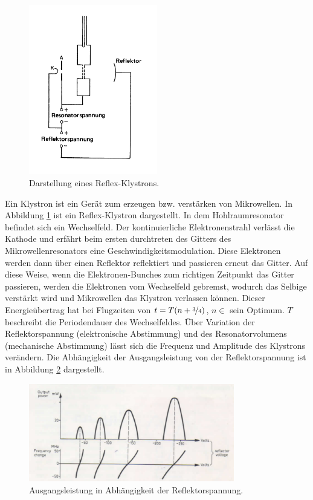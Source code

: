 \begin{figure}
    \centering
    \includegraphics[width=0.5\textwidth]{Bilder/reflex_klystron.PNG}
    \caption{Darstellung eines Reflex-Klystrons.\cite{Mikrowellen}}
    \label{fig:klystron}
\end{figure}

Ein Klystron ist ein Gerät zum erzeugen bzw. verstärken von Mikrowellen. In Abbildung \ref{fig:klystron} ist ein Reflex-Klystron dargestellt. In dem Hohlraumresonator befindet sich ein Wechselfeld. Der kontinuierliche Elektronenstrahl verlässt die Kathode und erfährt beim ersten durchtreten des Gitters des Mikrowellenresonators eine Geschwindigkeitsmodulation. Diese Elektronen werden dann über einen Reflektor reflektiert und passieren erneut das Gitter. Auf diese Weise, wenn die Elektronen-Bunches zum richtigen Zeitpunkt das Gitter passieren, werden die Elektronen vom Wechselfeld gebremst, wodurch das Selbige verstärkt wird und Mikrowellen das Klystron verlassen können. Dieser Energieübertrag hat bei Flugzeiten von $t = T(n+\nicefrac{3}{4})$, $n \in $ sein Optimum. $T$ beschreibt die Periodendauer des Wechselfeldes. Über Variation der Reflektorspannung (elektronische Abstimmung) und des Resonatorvolumens (mechanische Abstimmung)
lässt sich die Frequenz und Amplitude des Klystrons verändern. Die Abhängigkeit der Ausgangsleistung von der Reflektorspannung ist in Abbildung \ref{fig:reflektor} dargestellt.

\begin{figure}
    \centering
    \includegraphics[width=0.8\textwidth]{Bilder/reflektor.PNG}
    \caption{Ausgangsleistung in Abhängigkeit der Reflektorspannung.\cite{Mikrowellen}}
    \label{fig:reflektor}
\end{figure}

